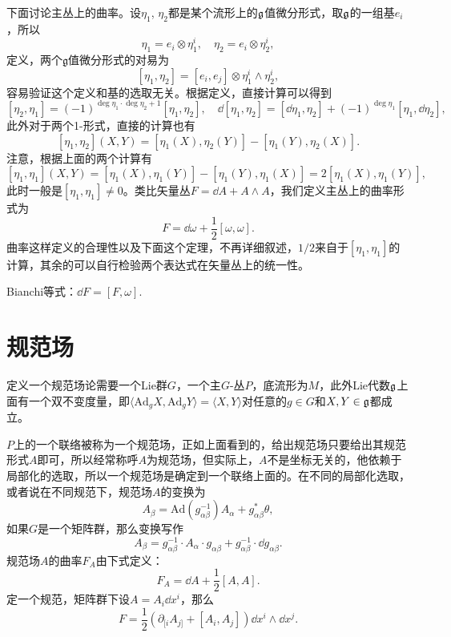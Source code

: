 下面讨论主丛上的曲率。设$\eta_1$, $\eta_2$都是某个流形上的${\mathfrak{g}}$值微分形式，取${\mathfrak{g}}$的一组基$e_i$，所以
\[
	\eta_1=e_i\otimes \eta_1^i,\quad \eta_2=e_i\otimes \eta_2^i,
\]
定义，两个$\mathfrak{g}$值微分形式的对易为
\[
	[\eta_1,\eta_2]=[e_i,e_j]\otimes \eta_1^i\wedge\eta_2^i,
\]
容易验证这个定义和基的选取无关。根据定义，直接计算可以得到
\[
	[\eta_2,\eta_1]=(-1)^{\deg \eta_1\cdot \deg \eta_2+1}[\eta_1,\eta_2],\quad \dd[\eta_1,\eta_2]=[\dd\eta_1,\eta_2]+(-1)^{\deg \eta_1}[\eta_1,\dd\eta_2],
\]
此外对于两个1-形式，直接的计算也有
\[
	[\eta_1,\eta_2](X,Y)=[\eta_1(X),\eta_2(Y)]-[\eta_1(Y),\eta_2(X)].
\]
注意，根据上面的两个计算有
\[
	[\eta_1,\eta_1](X,Y)=[\eta_1(X),\eta_1(Y)]-[\eta_1(Y),\eta_1(X)]=2[\eta_1(X),\eta_1(Y)],
\]
此时一般是$[\eta_1,\eta_1]\neq 0$。类比矢量丛$F=\dd A+A\wedge A$，我们定义主丛上的曲率形式为
\[
	F=\dd \omega+\frac{1}{2}[\omega,\omega].
\]
曲率这样定义的合理性以及下面这个定理，不再详细叙述，$1/2$来自于$[\eta_1,\eta_1]$的计算，其余的可以自行检验两个表达式在矢量丛上的统一性。
\begin{theo}Bianchi等式：$\dd F=[F,\omega]$.
\end{theo}


\section{规范场}
定义一个规范场论需要一个Lie群$G$，一个主$G$-丛$P$，底流形为$M$，此外Lie代数${\mathfrak{g}}$上面有一个双不变度量，即$\langle \mathrm{Ad}_gX,\mathrm{Ad}_gY\rangle=\langle X,Y\rangle$对任意的$g\in G$和$X,Y\in {\mathfrak{g}}$都成立。

$P$上的一个联络被称为一个规范场，正如上面看到的，给出规范场只要给出其规范形式$A$即可，所以经常称呼$A$为规范场，但实际上，$A$不是坐标无关的，他依赖于局部化的选取，所以一个规范场是确定到一个联络上面的。在不同的局部化选取，或者说在不同规范下，规范场$A$的变换为
\[
	A_\beta=\mathrm{Ad}(g_{\alpha\beta}^{-1})A_\alpha+g_{\alpha\beta}^*\theta,
\]
如果$G$是一个矩阵群，那么变换写作
\[
	A_\beta=g_{\alpha\beta}^{-1}\cdot A_\alpha \cdot g_{\alpha\beta}+g_{\alpha\beta}^{-1}\cdot \dd g_{\alpha\beta}.
\]
规范场$A$的曲率$F_A$由下式定义：
\[
	F_A=\dd A+\frac{1}{2}[A,A].
\]
定一个规范，矩阵群下设$A=A_i\dd x^i$，那么
\[
	F=\frac{1}{2}\left(\partial_{[i}A_{j]}+[A_i,A_j]\right)\dd x^i\wedge \dd x^j.
\]

